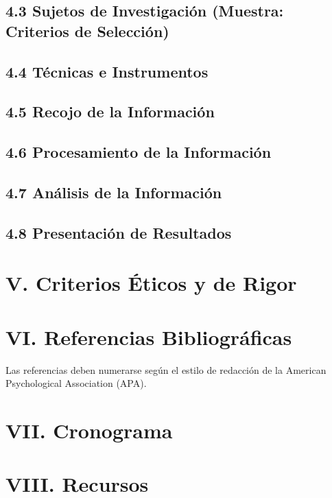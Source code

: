 \documentclass[12pt]{../componentes/uns}
\begin{document}
\subsection*{4.3 Sujetos de Investigación (Muestra: Criterios de Selección)}
\lipsum[12]

\subsection*{4.4 Técnicas e Instrumentos}
\lipsum[13]

\subsection*{4.5 Recojo de la Información}
\lipsum[14]

\subsection*{4.6 Procesamiento de la Información}
\lipsum[15]

\subsection*{4.7 Análisis de la Información}
\lipsum[16]

\subsection*{4.8 Presentación de Resultados}
\lipsum[17]

\section*{V. Criterios Éticos y de Rigor}
\lipsum[18]

\section*{VI. Referencias Bibliográficas}
Las referencias deben numerarse según el estilo de redacción de la American Psychological Association (APA).

\section*{VII. Cronograma}
\lipsum[19]

\section*{VIII. Recursos}
\end{document}
